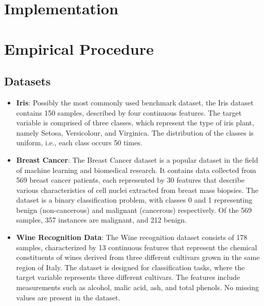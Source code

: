 \documentclass[conference]{IEEEtran}
\begin{document}
\section{Implementation}

    

\section{Empirical Procedure}


    \subsection{Datasets}

    \begin{itemize}
        \item \textbf{Iris}: Possibly the most commonly used benchmark dataset, the Iris dataset contains 150 samples, 
        described by four continuous features. The target variable is comprised of three classes, which represent the 
        type of iris plant, namely Setosa, Versicolour, and Virginica. The distribution of the classes is uniform, i.e., 
        each class occurs 50 times.
        
        \item \textbf{Breast Cancer}: The Breast Cancer dataset is a popular dataset in the field of machine learning and 
        biomedical research. It contains data collected from 569 breast cancer patients, each represented by 30 features 
        that describe various characteristics of cell nuclei extracted from breast mass biopsies. The dataset is a binary 
        classification problem, with classes 0 and 1 representing benign (non-cancerous) and malignant (cancerous) respectively. 
        Of the 569 samples, 357 instances are malignant, and 212 benign.
        
        \item \textbf{Wine Recognition Data}: The Wine recognition dataset consists of 178 samples, characterized by 13 
        continuous features that represent the chemical constituents of wines derived from three different cultivars grown 
        in the same region of Italy. The dataset is designed for classification tasks, where the target variable represents 
        three different cultivars. The features include measurements such as alcohol, malic acid, ash, and total phenols. 
        No missing values are present in the dataset.
        

\end{itemize}
\end{document}
